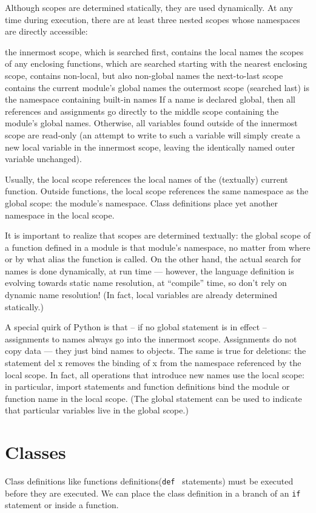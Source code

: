 \documentclass[12pt,a4paper]{article}
\begin{document}
Although scopes are determined statically, they are used dynamically. At any time during execution, there are at least three nested scopes whose namespaces are directly accessible:

the innermost scope, which is searched first, contains the local names 
the scopes of any enclosing functions, which are searched starting with the nearest enclosing scope, contains non-local, but also non-global names 
the next-to-last scope contains the current module’s global names 
the outermost scope (searched last) is the namespace containing built-in names 
If a name is declared global, then all references and assignments go directly to the middle scope containing the module’s global names. Otherwise, all variables found outside of the innermost scope are read-only (an attempt to write to such a variable will simply create a new local variable in the innermost scope, leaving the identically named outer variable unchanged).

Usually, the local scope references the local names of the (textually) current function. Outside functions, the local scope references the same namespace as the global scope: the module’s namespace. Class definitions place yet another namespace in the local scope.

It is important to realize that scopes are determined textually: the global scope of a function defined in a module is that module’s namespace, no matter from where or by what alias the function is called. On the other hand, the actual search for names is done dynamically, at run time — however, the language definition is evolving towards static name resolution, at “compile” time, so don’t rely on dynamic name resolution! (In fact, local variables are already determined statically.)

A special quirk of Python is that – if no global statement is in effect – assignments to names always go into the innermost scope. Assignments do not copy data — they just bind names to objects. The same is true for deletions: the statement del x removes the binding of x from the namespace referenced by the local scope. In fact, all operations that introduce new names use the local scope: in particular, import statements and function definitions bind the module or function name in the local scope. (The global statement can be used to indicate that particular variables live in the global scope.)
\clearpage

\section{Classes}
Class definitions like functions definitions(\texttt{def } statements) must be executed before they are executed. We can place the class definition in a branch of an \texttt{if} statement or inside a function.
\end{document}
